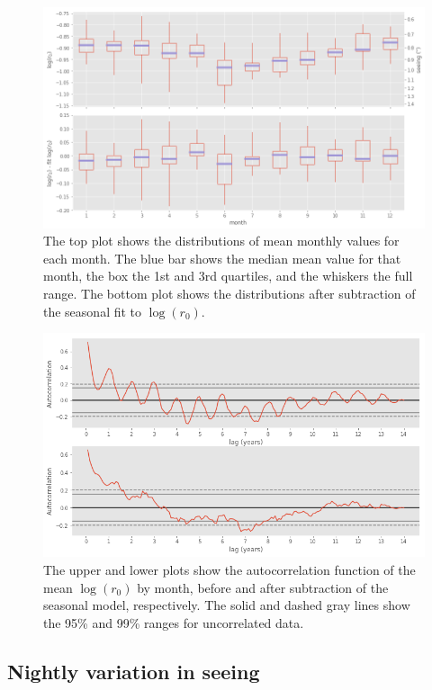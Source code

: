 \documentclass[\docopts]{\docclass}
\begin{document}
\begin{figure}
  \includegraphics[width=\columnwidth]{monthly_boxplot.png}
  \caption{The top plot shows the distributions of mean monthly values
    for each month. The blue bar shows the median mean value for that
    month, the box the 1st and 3rd quartiles, and the whiskers the
    full range. The bottom plot shows the distributions after
    subtraction of the seasonal fit to $\log(r_0)$.}
  \label{fig:monthly-boxplot}
\end{figure}

\begin{figure}
  \includegraphics[width=\columnwidth]{seasonal_sub_autocorr.png}
  \caption{The upper and lower plots show the autocorrelation function
  of the mean $\log(r_0)$ by month, before and after subtraction of
  the seasonal model, respectively. The solid and dashed gray lines show
  the 95\% and 99\% ranges for uncorrelated data.}
  \label{fig:seasonal-sub-autocorr}
\end{figure}

\subsection{Nightly variation in seeing}
\label{sec:nightly-variation}
\end{document}
